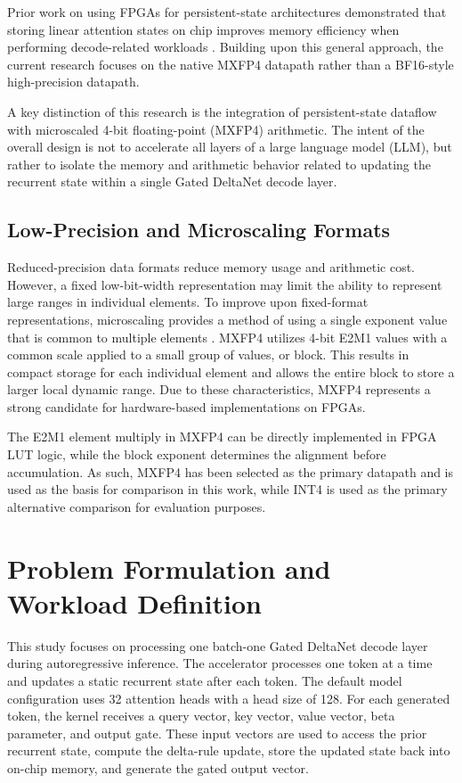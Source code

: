 \documentclass[conference]{IEEEtran}
\begin{document}
Prior work on using FPGAs for persistent-state architectures demonstrated that storing linear attention states on chip improves memory efficiency when performing decode-related workloads \cite{b10}. Building upon this general approach, the current research focuses on the native MXFP4 datapath rather than a BF16-style high-precision datapath.

A key distinction of this research is the integration of persistent-state dataflow with microscaled 4-bit floating-point (MXFP4) arithmetic. The intent of the overall design is not to accelerate all layers of a large language model (LLM), but rather to isolate the memory and arithmetic behavior related to updating the recurrent state within a single Gated DeltaNet decode layer.

\subsection{Low-Precision and Microscaling Formats}
Reduced-precision data formats reduce memory usage and arithmetic cost. However, a fixed low-bit-width representation may limit the ability to represent large ranges in individual elements. To improve upon fixed-format representations, microscaling provides a method of using a single exponent value that is common to multiple elements \cite{b12}. MXFP4 utilizes 4-bit E2M1 values with a common scale applied to a small group of values, or block. This results in compact storage for each individual element and allows the entire block to store a larger local dynamic range. Due to these characteristics, MXFP4 represents a strong candidate for hardware-based implementations on FPGAs.

The E2M1 element multiply in MXFP4 can be directly implemented in FPGA LUT logic, while the block exponent determines the alignment before accumulation. As such, MXFP4 has been selected as the primary datapath and is used as the basis for comparison in this work, while INT4 is used as the primary alternative comparison for evaluation purposes.

\section{Problem Formulation and Workload Definition}
This study focuses on processing one batch-one Gated DeltaNet decode layer during autoregressive inference. The accelerator processes one token at a time and updates a static recurrent state after each token. The default model configuration uses 32 attention heads with a head size of 128. For each generated token, the kernel receives a query vector, key vector, value vector, beta parameter, and output gate. These input vectors are used to access the prior recurrent state, compute the delta-rule update, store the updated state back into on-chip memory, and generate the gated output vector.
\end{document}
